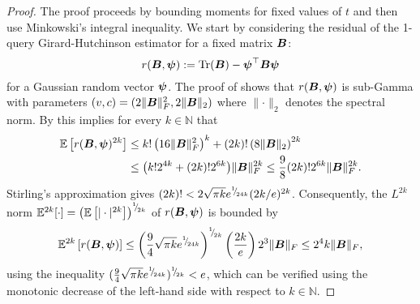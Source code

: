 \begin{proof} 
The proof proceeds by bounding moments for fixed values of $t$ and then use Minkowski's integral inequality. We start by considering the residual of the 1-query Girard-Hutchinson estimator for a fixed matrix $\boldsymbol{B}$: 
    \begin{equation}
        r(\boldsymbol{B}, \boldsymbol{\psi}) := \operatorname{Tr}(\boldsymbol{B}) - \boldsymbol{\psi}^{\top} \boldsymbol{B} \boldsymbol{\psi}
    \end{equation}
for a Gaussian random vector $\boldsymbol{\psi}$.
%
The proof of \cite[Lemma 3]{cortinovis-2022-randomized-trace} shows that $r(\boldsymbol{B}, \boldsymbol{\psi})$ is sub-Gamma with parameters $(v, c) = (2 \lVert \boldsymbol{B} \rVert _F^2, 2 \lVert \boldsymbol{B} \rVert _2)$ where $\lVert \cdot \rVert _2$ denotes the spectral norm. By \cite[Theorem 2.3]{boucheron-2013-concentration-inequalities} this implies for every $k \in \mathbb{N}$ that
    \begin{align*}
        \mathbb{E}\left[ r(\boldsymbol{B}, \boldsymbol{\psi})^{2 k} \right]
        &\leq k! \left( 16 \lVert \boldsymbol{B} \rVert _F^2 \right)^k + (2 k)! \left( 8 \lVert \boldsymbol{B} \rVert _2 \right)^{2 k}  \\
        &\le \big( k! 2^{4 k} + (2 k)! 2^{6 k}\big) \lVert \boldsymbol{B} \rVert _F^{2 k} 
        \le \frac{9}{8} (2 k)! 2^{6 k} \lVert \boldsymbol{B} \rVert _F^{2k}.
    \end{align*}
    Stirling's approximation \cite{robbins-1955-remark-stirling} gives $(2 k)! < 2 \sqrt{\pi k}  e^{{}^{1}{\mskip -5mu/\mskip -3mu}_{24 k}} ( 2 k / e )^{2 k}$. Consequently, the $L^{2k}$ norm $\mathbb{E}^{2k}[\cdot] = \left(\mathbb{E}\left[ | \cdot |^{2k} \right] \right)^{{}^{1}{\mskip -5mu/\mskip -3mu}_{2k}}$ of $r(\boldsymbol{B}, \boldsymbol{\psi})$ is bounded by
    \begin{equation}
        \mathbb{E}^{2k}\left[ r(\boldsymbol{B}, \boldsymbol{\psi}) \right]
        \leq \left( \frac{9}{4} \sqrt{\pi k} e^{{}^{1}{\mskip -5mu/\mskip -3mu}_{24 k}} \right)^{{}^{1}{\mskip -5mu/\mskip -3mu}_{2k}} \left( \frac{2 k}{e}\right) 2^{3} \lVert \boldsymbol{B} \rVert _F \leq 2^4 k \lVert \boldsymbol{B} \rVert _F,
        \label{equ:hutchinson-trace-onequery-fixed}
    \end{equation}
    using the inequality $(\frac{9}{4} \sqrt{\pi k} e^{{}^{1}{\mskip -5mu/\mskip -3mu}_{24 k}})^{{}^{1}{\mskip -5mu/\mskip -3mu}_{2k}} < e$, which can be verified using the monotonic decrease of the left-hand side with respect to $k \in \mathbb{N}$.


\end{proof}
